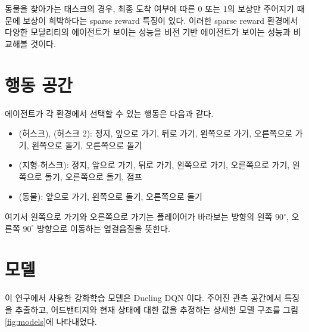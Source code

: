 \documentclass[oneside, under, ko]{snuthesis}
\begin{document}
동물을 찾아가는 태스크의 경우, 최종 도착 여부에 따른 0 또는 1의 보상만 주어지기 때문에 보상이 희박하다는 sparse reward 특징이 있다. 이러한 sparse reward 환경에서 다양한 모달리티의 에이전트가 보이는 성능을 비전 기반 에이전트가 보이는 성능과 비교해볼 것이다.

\section{행동 공간}
에이전트가 각 환경에서 선택할 수 있는 행동은 다음과 같다.
\begin{itemize}
    \item (허스크), (허스크 2): 정지, 앞으로 가기, 뒤로 가기, 왼쪽으로 가기, 오른쪽으로 가기, 왼쪽으로 돌기, 오른쪽으로 돌기
    \item (지형-허스크): 정지, 앞으로 가기, 뒤로 가기, 왼쪽으로 가기, 오른쪽으로 가기, 왼쪽으로 돌기, 오른쪽으로 돌기, 점프
    \item (동물): 앞으로 가기, 왼쪽으로 돌기, 오른쪽으로 돌기
\end{itemize}
여기서 왼쪽으로 가기와 오른쪽으로 가기는 플레이어가 바라보는 방향의 왼쪽 $90^\circ$, 오른쪽 $90^\circ$ 방향으로 이동하는 옆걸음질을 뜻한다.

\section{모델}
이 연구에서 사용한 강화학습 모델은 Dueling DQN \cite{DuelingDQN}이다. 주어진 관측 공간에서 특징을 추출하고, 어드밴티지와 현재 상태에 대한 값을 추정하는 상세한 모델 구조를 그림 \ref{fig:models}에 나타내었다.
\end{document}
